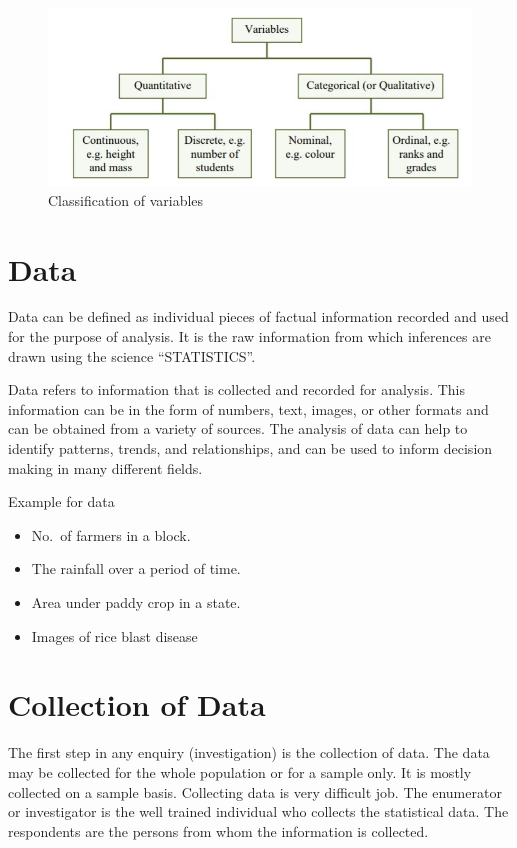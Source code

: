 \documentclass[
]{book}
\begin{document}
\begin{figure}

{\centering \includegraphics[width=0.7\linewidth]{images/image2} 

}

\caption{Classification of variables}\label{fig:variables}
\end{figure}

\hypertarget{data}{%
\section{Data}\label{data}}

Data can be defined as individual pieces of factual information recorded
and used for the purpose of analysis. It is the raw information from
which inferences are drawn using the science ``STATISTICS''.

Data refers to information that is collected and recorded for analysis. This information can be in the form of numbers, text, images, or other formats and can be obtained from a variety of sources. The analysis of data can help to identify patterns, trends, and relationships, and can be used to inform decision making in many different fields.

Example for data

\begin{itemize}
\item
  No.~of farmers in a block.
\item
  The rainfall over a period of time.
\item
  Area under paddy crop in a state.
\item
  Images of rice blast disease
\end{itemize}

\hypertarget{collection-of-data}{%
\section{Collection of Data}\label{collection-of-data}}

The first step in any enquiry (investigation) is the collection of data.
The data may be collected for the whole population or for a sample only.
It is mostly collected on a sample basis. Collecting data is very
difficult job. The enumerator or investigator is the well trained
individual who collects the statistical data. The respondents are the
persons from whom the information is collected.
\end{document}
